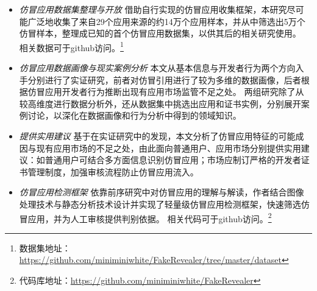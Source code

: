 \begin{itemize}
	\setlength{\itemsep}{1pt}
	      \setlength{\parskip}{0pt}
	      \setlength{\parsep}{0pt}
	\item \emph{仿冒应用数据集整理与开放} \quad
	      借助自行实现的仿冒应用收集框架，本研究尽可能广泛地收集了来自29个应用来源的约14万个应用样本，并从中筛选出5万个仿冒样本，整理成已知的首个仿冒应用数据集，以供其后的相关研究使用。
	      相关数据可于github访问。\footnote{数据集地址：\url{https://github.com/miniminiwhite/FakeRevealer/tree/master/dataset}}

	\item \emph{仿冒应用数据画像与现实案例分析} \quad
	      本文从基本信息与开发者行为两个方向入手分别进行了实证研究，前者对仿冒引用进行了较为多维的数据画像，后者根据仿冒应用开发者行为推断出现有应用市场监管不足之处。
	      两组研究除了从较高维度进行数据分析外，还从数据集中挑选出应用和证书实例，分别展开案例讨论，以深化在数据画像和行为分析中得到的领域知识。

	\item \emph{提供实用建议} \quad
	      基于在实证研究中的发现，本文分析了仿冒应用特征的可能成因与现有应用市场的不足之处，由此面向普通用户、应用市场分别提供实用建议：如普通用户可结合多方面信息识别仿冒应用；市场应制订严格的开发者证书管理制度，加强审核流程防止仿冒应用流入。

	\item \emph{仿冒应用检测框架} \quad
	      依靠前序研究中对仿冒应用的理解与解读，作者结合图像处理技术与静态分析技术设计并实现了轻量级仿冒应用检测框架\mytool ，快速筛选仿冒应用，并为人工审核提供判别依据。
	      相关代码可于github访问。\footnote{代码库地址：\url{https://github.com/miniminiwhite/FakeRevealer}}

\end{itemize}



